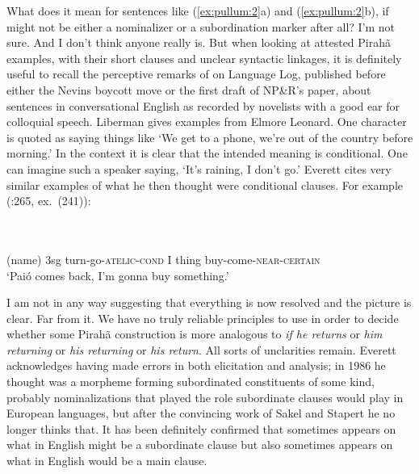\documentclass[output=paper,colorlinks,citecolor=brown
]{langscibook}
\begin{document}
What does it mean for sentences like (\ref{ex:pullum:2}a) and (\ref{ex:pullum:2}b), if \mbox{}
might not be either a nominalizer or a subordination marker after all?
I'm not sure. And I don't think anyone really is. But when looking at
attested Pirah{\~a} examples, with their short clauses and unclear
syntactic linkages, it is definitely useful to recall the perceptive
remarks of \citet{Liberman06} on Language Log, published before either
the Nevins boycott move or the first draft of NP\&R's paper, about
sentences in conversational English as recorded by novelists with a
good ear for colloquial speech. Liberman gives examples from Elmore
Leonard. One character is quoted as saying things like `We get to a
phone, we're out of the country before morning.' In the context it
is clear that the intended meaning is conditional. One can imagine
such a speaker saying, `It's raining, I don't go.' Everett cites very
similar examples of what he then thought were conditional clauses.
For example (\citealt{Everett86HAL}:265, ex.~(241)):

\ea
\label{ex:pullum:5}
 \\
\gll  {}  
               \\
      (name) 3sg turn-go-\textsc{atelic}-\textsc{cond} I thing buy-come-\textsc{near}-\textsc{certain} \\
\glt `Pai\'o comes back, I'm gonna buy something.'
\z

I am not in any way suggesting that everything is now resolved and
the picture is clear. Far from it. We have no truly reliable principles
to use in order to decide whether some Pirah{\~a} construction is
more analogous to \textit{if he returns} or \textit{him returning}
or \textit{his returning} or \textit{his return}. All sorts of
unclarities remain. Everett acknowledges having made errors in both
elicitation and analysis; in 1986 he thought \mbox{} was
a morpheme forming subordinated constituents of some kind, probably
nominalizations that played the role subordinate clauses would play
in European languages, but after the convincing work of Sakel and
Stapert he no longer thinks that. It has been definitely confirmed
that \mbox{} sometimes appears on what in English might
be a subordinate clause but also sometimes appears on what in English
would be a main clause.
\end{document}
